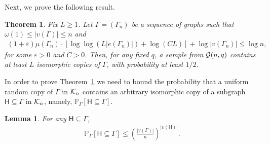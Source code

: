 \documentclass[12pt]{article}
\newtheorem{theorem}{Theorem}
\newtheorem{lemma}{Lemma}
\def\P{{\mathbb P}}
\newcommand{\calG}{{\cal G}}
\newcommand{\calK}{{\cal K}}
\newcommand{\p}[1]{\left(#1\right)}
\newcommand{\s}[1]{\mathsf{#1}}
\begin{document}
Next, we prove the following result.
\begin{theorem}
\label{theorem:sublogProb}
    Fix $L\geq1$. Let $\Gamma=(\Gamma_n)$ be a sequence of graphs such that $\omega(1) \leq |v(\Gamma)|\leq n $  and
    \begin{align}
        (1+\varepsilon)\mu(\Gamma_n)\cdot [\log\log(L|e(\Gamma_n)|)+\log(CL)]+\log|v(\Gamma_n)|\leq \log n,\label{eq:condCopy}
    \end{align}
    for some $\varepsilon>0$ and $C>0$. Then, for any fixed $q$, a sample from $\calG(n,q)$ contains at least $L$ isomorphic copies of $\Gamma$, with probability at least $1/2$.
\end{theorem}
In order to prove Theorem~\ref{theorem:sublogProb} we need to bound the probability that a uniform random copy of $\Gamma$ in $\calK_n$ contains an arbitrary isomorphic copy of a subgraph $\s{H}\subseteq \Gamma$ in $\calK_n$, namely, $\P_{\Gamma}[\s{H}\subseteq \Gamma]$.  
\begin{lemma}\label{lem:probcalc2} For any $\s{H}\subseteq \Gamma$,
\begin{align}
    \P_{\Gamma}[\s{H}\subseteq \Gamma]\leq \p{\frac{|v(\Gamma)|}{n}}^{|v(\s{H})|}.
\end{align}
\end{lemma}
\end{document}
